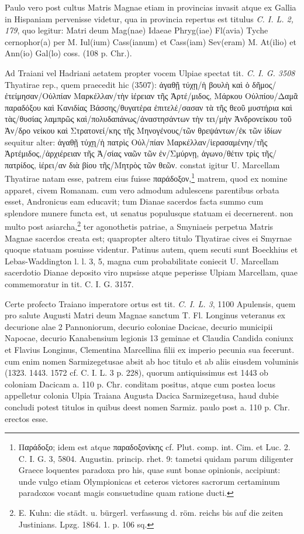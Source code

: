 \documentclass[a4paper, 11pt, oneside, polutonikogreek, german, twocolumn]{article}
\begin{document}
Paulo vero post cultus Matris Magnae etiam in provincias invasit atque ex Gallia in Hispaniam pervenisse videtur, qua in provincia repertus est titulus \emph{C. I. L. 2, 179}, quo legitur: Matri deum Mag(nae) Idaeae Phryg(iae) Fl(avia) Tyche cernophor(a) per M. Iul(ium) Cass(ianum) et Cass(iam) Sev(eram) M. At(ilio) et Ann(io) Gal(lo) coss. (108 p. Chr.).

Ad Traiani vel Hadriani aetatem propter vocem Ulpiae spectat tit. \emph{C. I. G. 3508} Thyatirae rep., quem praecedit hic (3507): ἀγαθῇ τύχῃ/ἡ βουλὴ καὶ ὁ δῆμος/ἐτείμησαν/Οὐλπίαν Μαρκέλλαν/τὴν ἱέρειαν τῆς Ἀρτέ/μιδος, Μάρκου Οὐλπίου/Δαμᾶ παραδόξου καὶ Κανιδίας Βάσσης/θυγατέρα ἐπιτελέ/σασαν τὰ τῆς θεοῦ μυστήρια καὶ τὰς/θυσίας λαμπρῶς καὶ/πολυδαπάνως/ἀναστησάντων τὴν τει/μὴν Ἀνδρονείκου τοῦ Ἀν/δρο νείκου καὶ Στρατονεί/κης τῆς Μηνογένους/τῶν θρεψάντων/ἐκ τῶν ἰδίων sequitur alter: ἀγαθῇ τύχῃ/ἡ πατρὶς Οὐλ/πίαν Μαρκέλλαν/ἱερασαμένην/τῆς Ἀρτέμιδος,/ἀρχιέρειαν τῆς Ἀ/σίας ναῶν τῶν ἐν/Σμύρνῃ, ἀγωνο/θέτιν τρὶς τῆς/πατρίδος, ἱέρει/αν διὰ βίου τῆς/Μητρὸς τῶν θεῶν. constat igitur U. Marcellam Thyatirae natam esse, patrem eius fuisse παράδοξον,\footnote{Παράδοξο; idem est atque παραδοξονίκης cf. Plut. comp. int. Cim. et Luc. 2. C. I. G. 3, 5804. Augustin. princip. rhet. 9: tametsi quidam parum diligenter Graece loquentes paradoxa pro his, quae sunt bonae opinionis, accipiunt: unde vulgo etiam Olympionicas et ceteros victores sacrorum certaminum paradoxos vocant magis consuetudine quam ratione ducti.} matrem, quod ex nomine apparet, civem Romanam. cum vero admodum adulescens parentibus orbata esset, Andronicus eam educavit; tum Dianae sacerdos facta summo cum splendore munere functa est, ut senatus populusque statuam ei decernerent. non multo post asiarcha,\footnote{E. Kuhn: die städt. u. bürgerl. verfassung d. röm. reichs bis auf die zeiten Justinians. Lpzg. 1864. 1. p. 106 sq.} ter agonothetis patriae, a Smyniaeis perpetua Matris Magnae sacerdos creata est; quapropter altero titulo Thyatirae cives ei Smyrnae quoque statuam posuisse videntur. Patinus autem, quem secuti sunt Boeckhius et Lebas-Waddington l. l. 3, 5, magna cum probabilitate coniecit U. Marcellam sacerdotio Dianae deposito viro nupsisse atque peperisse Ulpiam Marcellam, quae commemoratur in tit. C. I. G. 3157.

Certe profecto Traiano imperatore ortus est tit. \emph{C. I. L. 3}, 1100 Apulensis, quem pro salute Augusti Matri deum Magnae sanctum T. Fl. Longinus veteranus ex decurione alae 2 Pannoniorum, decurio coloniae Dacicae, decurio municipii Napocae, decurio Kanabensium legionis 13 geminae et Claudia Candida coniunx et Flavius Longinus, Clementina Marcellina filii ex imperio pecunia sua fecerunt. cum enim nomen Sarmizegetusae absit ab hoc titulo et ab aliis eiusdem voluminis (1323. 1443. 1572 cf. C. I. L. 3 p. 228), quorum antiquissimus est 1443 ob coloniam Dacicam a. 110 p. Chr. conditam positus, atque cum postea locus appelletur colonia Ulpia Traiana Augusta Dacica Sarmizegetusa, haud dubie concludi potest titulos in quibus deest nomen Sarmiz. paulo post a. 110 p. Chr. erectos esse.
\end{document}
